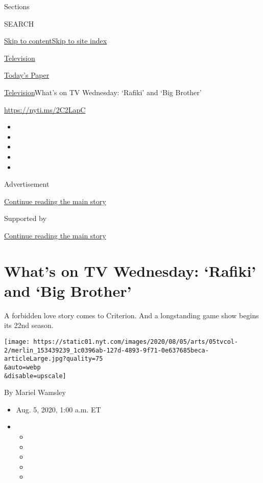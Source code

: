 Sections

SEARCH

\protect\hyperlink{site-content}{Skip to
content}\protect\hyperlink{site-index}{Skip to site index}

\href{https://www.nytimes.com/section/arts/television}{Television}

\href{https://myaccount.nytimes.com/auth/login?response_type=cookie\&client_id=vi}{}

\href{https://www.nytimes.com/section/todayspaper}{Today's Paper}

\href{/section/arts/television}{Television}\textbar{}What's on TV
Wednesday: `Rafiki' and `Big Brother'

\url{https://nyti.ms/2C2LapC}

\begin{itemize}
\item
\item
\item
\item
\item
\end{itemize}

Advertisement

\protect\hyperlink{after-top}{Continue reading the main story}

Supported by

\protect\hyperlink{after-sponsor}{Continue reading the main story}

\hypertarget{whats-on-tv-wednesday-rafiki-and-big-brother}{%
\section{What's on TV Wednesday: `Rafiki' and `Big
Brother'}\label{whats-on-tv-wednesday-rafiki-and-big-brother}}

A forbidden love story comes to Criterion. And a longstanding game show
begins its 22nd season.

\texttt{[image: https://static01.nyt.com/images/2020/08/05/arts/05tvcol-2/merlin\_153439239\_1c0396ab-127d-4893-9f71-0e637685beca-articleLarge.jpg?quality=75\\\&auto=webp\\\&disable=upscale]}

By Mariel Wamsley

\begin{itemize}
\item
  Aug. 5, 2020, 1:00 a.m. ET
\item
  \begin{itemize}
  \item
  \item
  \item
  \item
  \item
  \end{itemize}
\end{itemize}

